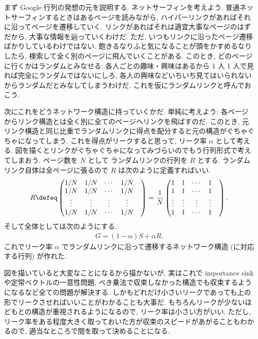 \documentclass[openany, a4paper, oneside]{jsbook}
\begin{document}
まず Google 行列の発想の元を説明する.
ネットサーフィンを考えよう.
普通ネットサーフィンするときはあるページを読みながら,
ハイパーリンクがあればそれに沿ってページを遷移していく.
リンクがあればそれは適宜大事なページのはずだから, 大事な情報を辿っていくわけだ.
ただ, いつもリンクに沿ったページ遷移ばかりしているわけではない.
飽きるなりふと気になることが頭をかすめるなりしたら, 検索して全く別のページに飛んでいくことがある.
このとき, どのページに行くかはランダムとみなせる:
各人ごとの趣味・興味はあるから 1 人 1 人で見れば完全にランダムではないにしろ,
各人の興味などいちいち見てはいられないからランダムだとみなしてしまうわけだ.
これを仮にランダムリンクと呼んでおこう.

次にこれをどうネットワーク構造に持っていくかだ.
単純に考えよう: 各ページからリンク構造とは全く別に全てのページへリンクを飛ばすのだ.
このとき, 元リンク構造と同じ比重でランダムリンクに得点を配分すると元の構造がぐちゃぐちゃになってしまう.
これを得点がリークすると思って, リーク率 $\alpha$ として考える.
図を描くとリンクがぐちゃぐちゃになってみづらいのでもう行列形式で考えてしまおう.
ページ数を $N$ として ランダムリンクの行列を $R$ とする.
ランダムリンク自体は全ページに張るので $R$ は次のように定義すればいい.
\begin{align}
 R
 \defeq
 \begin{pmatrix}
  1/N & 1/N & \cdots & 1/N \\
  1/N & 1/N & \cdots & 1/N \\
  \vdots & \vdots & \vdots & \vdots & \\
  1/N & 1/N & \cdots & 1/N
 \end{pmatrix}
 =
 \frac{1}{N}
 \begin{pmatrix}
  1 & 1 & \cdots & 1 \\
  1 & 1 & \cdots & 1 \\
  \vdots & \vdots & \vdots & \vdots & \\
  1 & 1 & \cdots & 1
 \end{pmatrix}.
\end{align}
そして全体としては次のようにする.
\begin{align}
 G
 =
 (1 - \alpha) S + \alpha R.
\end{align}
これでリーク率 $\alpha$ でランダムリンクに沿って遷移するネットワーク構造 (に対応する行列) が作れた.

図を描いていると大変なことになるから描かないが,
実はこれで importance sink や定常ベクトルの一意性問題,
べき乗法で収束しなかった構造でも収束するようになるなど全ての問題が解決する.
しかもどれだけ小さいリークであっても上の形でリークさせればいいことがわかることも大事だ.
もちろんリークが少ないほどもとの構造が重視されるようになるので,
リーク率は小さい方がいい.
ただし, リーク率をある程度大きく取っておいた方が収束のスピードがあがることもわかるので,
適当なところで間を取って決めることになる.
\end{document}
